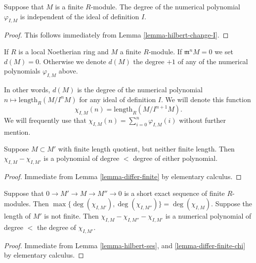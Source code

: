 \begin{lemma}
\label{lemma-d-independent}
Suppose that $M$ is a finite $R$-module.
The degree of the numerical polynomial
$\varphi_{I, M}$ is independent of the
ideal of definition $I$.
\end{lemma}

\begin{proof}
This follows immediately from Lemma \ref{lemma-hilbert-change-I}.
\end{proof}

\begin{definition}
\label{definition-d}
If $R$ is a local Noetherian ring and $M$ a finite $R$-module.
If $\mathfrak m^nM = 0$ we set $d(M) = 0$.
Otherwise we denote {\it $d(M)$} the degree $+1$ of any of the numerical
polynomials
$\varphi_{I, M}$ above.
\end{definition}

\noindent
In other words, $d(M)$ is the degree of the numerical polynomial
$n \mapsto \text{length}_R(M/I^nM)$ for any ideal of definition $I$.
We will denote this function
$$
\chi_{I, M}(n) = \text{length}_R(M/I^{n + 1}M).
$$
We will frequently use that $\chi_{I, M}(n)
= \sum_{i = 0}^n \varphi_{I, M}(i)$ without further mention.

\begin{lemma}
\label{lemma-differ-finite-chi}
Suppose $M \subset M'$ with finite length quotient,
but neither finite length.
Then $\chi_{I, M} - \chi_{I, M'}$
is a polynomial of degree $<$ degree of either
polynomial.
\end{lemma}

\begin{proof}
Immediate from Lemma \ref{lemma-differ-finite} by elementary calculus.
\end{proof}

\begin{lemma}
\label{lemma-hilbert-ses-chi}
Suppose that $0 \to M' \to M \to M'' \to 0$
is a short exact sequence of finite $R$-modules.
Then $\max\{ \deg(\chi_{I, M'}), \deg(\chi_{I, M''}) \}
= \deg(\chi_{I, M})$.
Suppose the length of $M'$ is not finite.
Then $\chi_{I, M} - \chi_{I, M''} - \chi_{I, M'}$
is a numerical polynomial of degree $<$ the degree of
$\chi_{I, M'}$.
\end{lemma}

\begin{proof}
Immediate from Lemma \ref{lemma-hilbert-ses}, and
\ref{lemma-differ-finite-chi} by elementary calculus.
\end{proof}



































